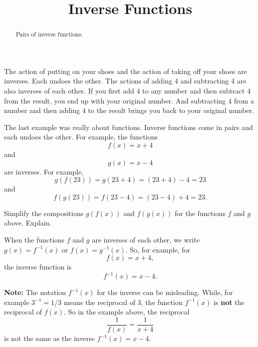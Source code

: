 \documentclass{ximera}
\title{Inverse Functions}
\begin{document}
\begin{abstract}
Pairs of inverse functions.
\end{abstract}
\maketitle

The action of putting on your shoes and the action of taking off your shoes are inverses. Each undoes the other. The actions of adding 4 and subtracting 4 are also inverses of each other. If you first add 4 to any number and then subtract 4 from the result, you end up with your original number. And subtracting 4 from a number and then adding 4 to the result brings you back to your original number. 

The last example was really about functions. Inverse functions come in pairs and each undoes the other. For example, the functions 
\[
    f(x) = x + 4
\]
and 
\[
  g(x) = x-4
\]
are inverses. For example,
\[
    g(f(23)) = g(23+4) =  (23+4) -4 = 23
\]
and
\[
    f(g(23)) = f(23-4) = (23-4) + 4 = 23 .
\]

\begin{question}   \label{Q1:Inverses}
Simplify the compositions $g(f(x))$ and $f(g(x))$ for the functions $f$ and $g$ above. Explain.
\end{question}

When the functions $f$ and $g$ are inverses of each other, we write $g(x) = f^{-1}(x)$ or $f(x) = g^{-1}(x)$. So, for example, for 
\[
   f(x) = x+4 ,
\]
the inverse function is
\[
   f^{-1}(x) = x-4.
\]

{\bf Note:} The notation $f^{-1}(x)$ for the inverse can be misleading. While, for example $3^{-1} = 1/3$ means the reciprocal of $3$, the function $f^{-1}(x)$ is {\bf not} the reciprocal of $f(x)$. So in the example above, the reciprocal
\[
     \frac{1}{f(x)} = \frac{1}{x+4} 
\] 
is not the same as the inverse $f^{-1}(x) = x-4$.
\end{document}
